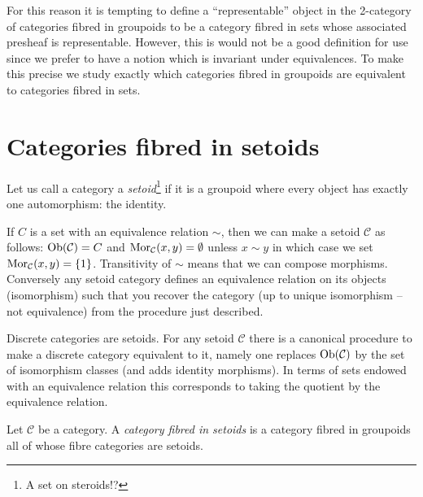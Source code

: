 \noindent
For this reason it is tempting to define a ``representable'' object in the
2-category of categories fibred in groupoids to be a category fibred in
sets whose associated presheaf is representable. However, this is would not
be a good definition for use since we prefer to have a notion which is
invariant under equivalences. To make this precise we study exactly
which categories fibred in groupoids are equivalent to categories
fibred in sets.









\section{Categories fibred in setoids}
\label{section-fibred-in-setoids}

\begin{definition}
\label{definition-setoid}
Let us call a category a {\it setoid}\footnote{A set on steroids!?}
if it is a groupoid where every object
has exactly one automorphism: the identity.
\end{definition}

\noindent
If $C$ is a set with an equivalence relation $\sim$, then we can make a setoid
$\mathcal{C}$ as follows: $\mathop{\mathrm{Ob}}\nolimits(\mathcal{C}) = C$ and
$\mathop{\mathrm{Mor}}\nolimits_\mathcal{C}(x, y) = \emptyset$ unless $x \sim y$ in which
case we set $\mathop{\mathrm{Mor}}\nolimits_\mathcal{C}(x, y) = \{1\}$. Transitivity of
$\sim$ means that we can compose morphisms. Conversely any setoid
category defines an equivalence relation on its objects (isomorphism)
such that you recover the category (up to unique isomorphism -- not
equivalence) from the procedure just described.

\medskip\noindent
Discrete categories are setoids. For any setoid $\mathcal{C}$ there is a
canonical procedure to make a discrete category equivalent to it, namely
one replaces $\mathop{\mathrm{Ob}}\nolimits(\mathcal{C})$ by the set of isomorphism
classes (and adds identity morphisms). In terms of sets endowed
with an equivalence relation this corresponds to taking the quotient
by the equivalence relation.

\begin{definition}
\label{definition-category-fibred-setoids}
Let $\mathcal{C}$ be a category. A {\it category fibred in setoids}
is a category fibred in groupoids all of whose fibre categories are
setoids.
\end{definition}

